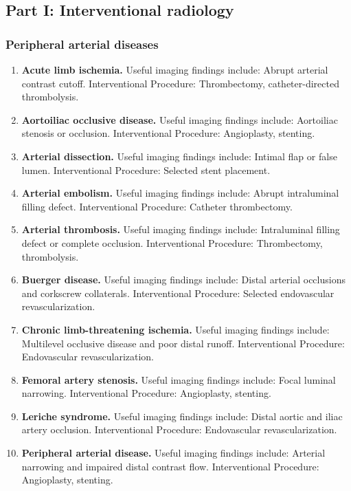 \subsection{Part I: Interventional radiology}

\subsubsection{Peripheral arterial diseases}
\begin{enumerate}[leftmargin=*,itemsep=0.45em,topsep=0.4em]
\item \textbf{Acute limb ischemia.} Useful imaging findings include: Abrupt arterial contrast cutoff. Interventional Procedure: Thrombectomy, catheter-directed thrombolysis.
\item \textbf{Aortoiliac occlusive disease.} Useful imaging findings include: Aortoiliac stenosis or occlusion. Interventional Procedure: Angioplasty, stenting.
\item \textbf{Arterial dissection.} Useful imaging findings include: Intimal flap or false lumen. Interventional Procedure: Selected stent placement.
\item \textbf{Arterial embolism.} Useful imaging findings include: Abrupt intraluminal filling defect. Interventional Procedure: Catheter thrombectomy.
\item \textbf{Arterial thrombosis.} Useful imaging findings include: Intraluminal filling defect or complete occlusion. Interventional Procedure: Thrombectomy, thrombolysis.
\item \textbf{Buerger disease.} Useful imaging findings include: Distal arterial occlusions and corkscrew collaterals. Interventional Procedure: Selected endovascular revascularization.
\item \textbf{Chronic limb-threatening ischemia.} Useful imaging findings include: Multilevel occlusive disease and poor distal runoff. Interventional Procedure: Endovascular revascularization.
\item \textbf{Femoral artery stenosis.} Useful imaging findings include: Focal luminal narrowing. Interventional Procedure: Angioplasty, stenting.
\item \textbf{Leriche syndrome.} Useful imaging findings include: Distal aortic and iliac artery occlusion. Interventional Procedure: Endovascular revascularization.
\item \textbf{Peripheral arterial disease.} Useful imaging findings include: Arterial narrowing and impaired distal contrast flow. Interventional Procedure: Angioplasty, stenting.

\end{enumerate}
